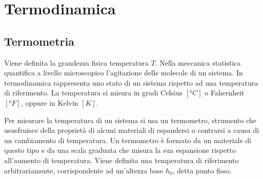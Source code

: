 \documentclass{article}
\numberwithin{equation}{subsection}
\begin{document}
\begin{center}\end{center}

\clearpage

\section{Termodinamica}

\subsection{Termometria}
Viene definita la grandezza fisica temperatura $T$. Nella 
meccanica statistica 
quantifica a livello microscopico l'agitazione delle molecole 
di un sistema. In termodinamica rappresenta uno stato di un  
sistema rispetto ad una temperatura di riferimento. La 
temperatura si misura in gradi Celsius $\left[\mbox{°}C\right]$ o 
Fahernheit $\left[\mbox{°}F\right]$, oppure in Kelvin $\left[K\right]$. 



Per misurare la temperatura di un sistema si usa un termometro, 
strumento che ususfruisce della proprietà di alcuni materiali di 
espandersi o contrarsi a causa di un cambiamento di temperatura.  
Un termometro è formato da un materiale di questo tipo e da una scala graduata che misura la sua 
espansione rispetto all'aumento di temperatura. Viene definita 
una temperatura di riferimento arbitrariamente, corrispondente 
ad un'altezza base $h_0$, detta punto fisso.
\end{document}
